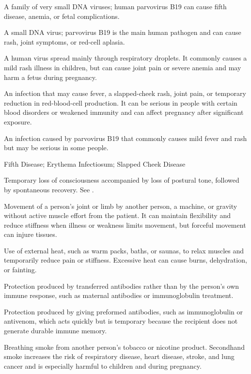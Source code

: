  A family of very small DNA viruses; human parvovirus B19 can cause fifth disease, anemia, or fetal complications.

 A small DNA virus; parvovirus B19 is the main human pathogen and can cause rash, joint symptoms, or red-cell aplasia.

 A human virus spread mainly through respiratory droplets. It commonly causes a mild rash illness in children, but can cause joint pain or severe anemia and may harm a fetus during pregnancy.

 An infection that may cause fever, a slapped-cheek rash, joint pain, or temporary reduction in red-blood-cell production. It can be serious in people with certain blood disorders or weakened immunity and can affect pregnancy after significant exposure.

 An infection caused by parvovirus B19 that commonly causes mild fever and rash but may be serious in some people.

\synonyms
Fifth Disease; Erythema Infectiosum; Slapped Cheek Disease

 Temporary loss of consciousness accompanied by loss of postural tone, followed by spontaneous recovery. See .

 Movement of a person's joint or limb by another person, a machine, or gravity without active muscle effort from the patient. It can maintain flexibility and reduce stiffness when illness or weakness limits movement, but forceful movement can injure tissues.

 Use of external heat, such as warm packs, baths, or saunas, to relax muscles and temporarily reduce pain or stiffness. Excessive heat can cause burns, dehydration, or fainting.

 Protection produced by transferred antibodies rather than by the person's own immune response, such as maternal antibodies or immunoglobulin treatment.

 Protection produced by giving preformed antibodies, such as immunoglobulin or antivenom, which acts quickly but is temporary because the recipient does not generate durable immune memory.

 Breathing smoke from another person's tobacco or nicotine product. Secondhand smoke increases the risk of respiratory disease, heart disease, stroke, and lung cancer and is especially harmful to children and during pregnancy.

